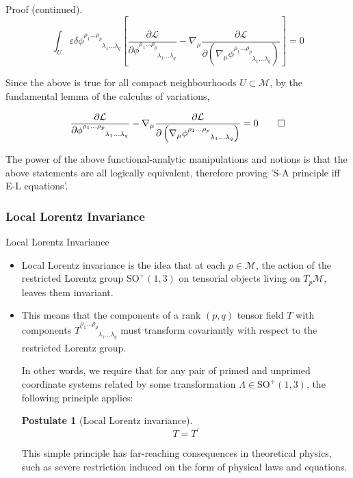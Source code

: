 \documentclass[9pt,handout]{beamer}
\newtheorem{postulate}{Postulate}
\begin{document}
\begin{frame}{}
\begin{block}{Proof (continued).}
$$\int_{U} \varepsilon \delta \phi^{\rho_1 \dots \rho_p}_{\phantom{\rho_1 \dots \rho_p} \lambda_1 \dots \lambda_q} \left[ \frac{\partial \mathcal{L}}{\partial \phi^{\rho_1 \dots \rho_p}_{\phantom{\rho_1 \dots \rho_p} \lambda_1 \dots \lambda_q}} - \nabla_\mu \frac{\partial \mathcal{L}}{\partial \left( \nabla_\mu \phi^{\rho_1 \dots \rho_p}_{\phantom{\rho_1 \dots \rho_p} \lambda_1 \dots \lambda_q} \right)} \right] = 0$$

Since the above is true for all compact neighbourhoods $U \subset \mathcal{M}$, by the fundamental lemma of the calculus of variations,

$$\frac{\partial \mathcal{L}}{\partial \phi^{\rho_1 \dots \rho_p}_{\phantom{\rho_1 \dots \rho_p} \lambda_1 \dots \lambda_q}} - \nabla_\mu \frac{\partial \mathcal{L}}{\partial \left( \nabla_\mu \phi^{\rho_1 \dots \rho_p}_{\phantom{\rho_1 \dots \rho_p} \lambda_1 \dots \lambda_q} \right)} = 0 \qed$$
\end{block}

The power of the above functional-analytic manipulations and notions is that the above statements are all logically equivalent, therefore proving 'S-A principle iff E-L equations'. 
\end{frame}

\subsubsection{Local Lorentz Invariance}
\begin{frame}{Local Lorentz Invariance}
\begin{itemize}
\item Local Lorentz invariance is the idea that at each $p \in \mathcal{M}$, the action of the restricted Lorentz group $\text{SO}^+ \left( 1, 3 \right)$ on tensorial objects living on $T_p \mathcal{M}$, leaves them invariant.

\item This means that the components of a rank $\left( p, q \right)$ tensor field $T$ with components $T^{\rho_1 \dots \rho_p}_{\phantom{\rho_1 \dots \rho_p} \lambda_1 \dots \lambda_q}$ must transform covariantly with respect to the restricted Lorentz group. 

In other words, we require that for any pair of primed and unprimed coordinate systems related by some transformation $\Lambda \in \text{SO}^+ \left( 1, 3 \right)$, the following principle applies:

\begin{postulate}[Local Lorentz invariance]
$$T = T^\prime$$
\end{postulate}

This simple principle has far-reaching consequences in theoretical physics, such as severe restriction induced on the form of physical laws and equations.
\end{itemize}	
\end{frame}
\end{document}
